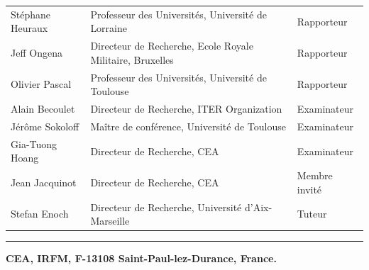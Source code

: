 \vspace{0.4cm}
\begin{tabular}{lll}
  Stéphane Heuraux & Professeur des Universit\'es,  Université de Lorraine  & Rapporteur\\
  \vspace{0.08cm}
  Jeff Ongena  & Directeur de Recherche, Ecole Royale Militaire, Bruxelles  & Rapporteur\\
  \vspace{0.08cm}
  Olivier Pascal & Professeur des Universit\'es,  Université de Toulouse & Rapporteur\\
  \vspace{0.08cm}
  Alain Becoulet & Directeur de Recherche, ITER Organization & Examinateur \\
  \vspace{0.08cm}
  Jérôme Sokoloff & Maître de conférence, Université de Toulouse & Examinateur \\ 
  \vspace{0.08cm}
  Gia-Tuong Hoang & Directeur de Recherche, CEA & Examinateur \\  
  \vspace{0.08cm}
  Jean Jacquinot & Directeur de Recherche, CEA & Membre invit\'e \\
  \vspace{0.08cm}
  Stefan Enoch & Directeur de Recherche, Universit\'e d'Aix-Marseille & Tuteur\\
  
\end{tabular}

\begin{center}
\vspace{0.2cm}
\hrule
\vspace{0.35cm}
\textbf{CEA, IRFM, F-13108 Saint-Paul-lez-Durance, France.}
\end{center}

